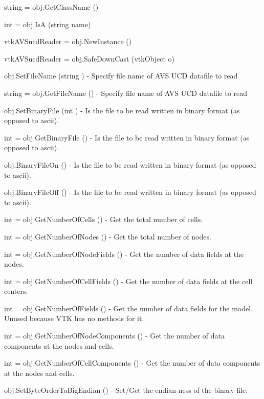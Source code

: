 \begin{DoxyItemize}
\item {\ttfamily string = obj.\-Get\-Class\-Name ()}  
\item {\ttfamily int = obj.\-Is\-A (string name)}  
\item {\ttfamily vtk\-A\-V\-Sucd\-Reader = obj.\-New\-Instance ()}  
\item {\ttfamily vtk\-A\-V\-Sucd\-Reader = obj.\-Safe\-Down\-Cast (vtk\-Object o)}  
\item {\ttfamily obj.\-Set\-File\-Name (string )} -\/ Specify file name of A\-V\-S U\-C\-D datafile to read  
\item {\ttfamily string = obj.\-Get\-File\-Name ()} -\/ Specify file name of A\-V\-S U\-C\-D datafile to read  
\item {\ttfamily obj.\-Set\-Binary\-File (int )} -\/ Is the file to be read written in binary format (as opposed to ascii).  
\item {\ttfamily int = obj.\-Get\-Binary\-File ()} -\/ Is the file to be read written in binary format (as opposed to ascii).  
\item {\ttfamily obj.\-Binary\-File\-On ()} -\/ Is the file to be read written in binary format (as opposed to ascii).  
\item {\ttfamily obj.\-Binary\-File\-Off ()} -\/ Is the file to be read written in binary format (as opposed to ascii).  
\item {\ttfamily int = obj.\-Get\-Number\-Of\-Cells ()} -\/ Get the total number of cells.  
\item {\ttfamily int = obj.\-Get\-Number\-Of\-Nodes ()} -\/ Get the total number of nodes.  
\item {\ttfamily int = obj.\-Get\-Number\-Of\-Node\-Fields ()} -\/ Get the number of data fields at the nodes.  
\item {\ttfamily int = obj.\-Get\-Number\-Of\-Cell\-Fields ()} -\/ Get the number of data fields at the cell centers.  
\item {\ttfamily int = obj.\-Get\-Number\-Of\-Fields ()} -\/ Get the number of data fields for the model. Unused because V\-T\-K has no methods for it.  
\item {\ttfamily int = obj.\-Get\-Number\-Of\-Node\-Components ()} -\/ Get the number of data components at the nodes and cells.  
\item {\ttfamily int = obj.\-Get\-Number\-Of\-Cell\-Components ()} -\/ Get the number of data components at the nodes and cells.  
\item {\ttfamily obj.\-Set\-Byte\-Order\-To\-Big\-Endian ()} -\/ Set/\-Get the endian-\/ness of the binary file.  

\end{DoxyItemize}
